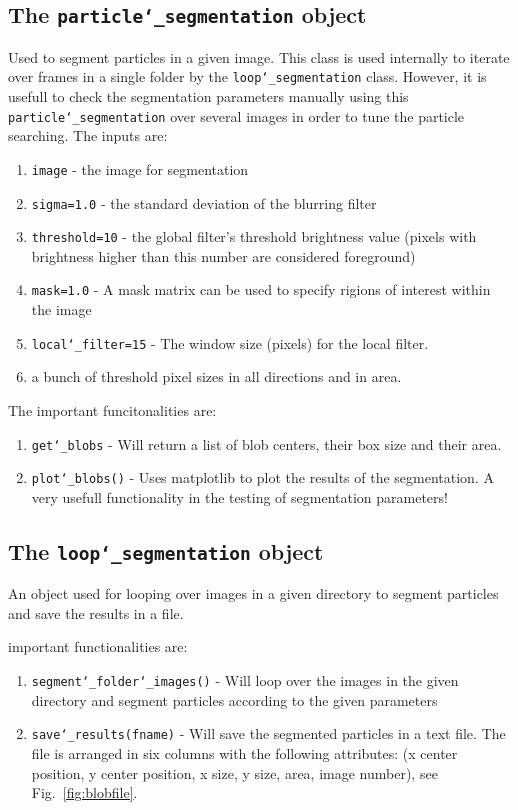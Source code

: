 \documentclass[10pt,a4paper]{article}
\begin{document}
\subsection{The \texttt{particle\char`_segmentation} object} 

Used to segment particles in a given image. This class is used internally to iterate over frames in a single folder by the \texttt{loop\char`_segmentation} class. However, it is usefull to check the segmentation parameters manually using this \texttt{particle\char`_segmentation} over several images in order to tune the particle searching. The inputs are:
%
\begin{enumerate}
	\item \texttt{image} - the image for segmentation
	\item \texttt{sigma=1.0} - the standard deviation of the blurring filter
	\item \texttt{threshold=10} - the global filter's threshold brightness value (pixels with brightness higher than this number are considered foreground) 
	\item \texttt{mask=1.0} - A mask matrix can be used to specify rigions of interest within the image
	\item \texttt{local\char`_filter=15} - The window size (pixels) for the local filter.
	\item a bunch of threshold pixel sizes in all directions and in area.
\end{enumerate}


The important funcitonalities are:
%
\begin{enumerate}
	\item \texttt{get\char`_blobs} - Will return a list of blob centers, their box size and their area.
	\item \texttt{plot\char`_blobs()} - Uses matplotlib to plot the results of the segmentation. A very usefull functionality in the testing of segmentation parameters!
\end{enumerate}






\subsection{The \texttt{loop\char`_segmentation} object} 


An object used for looping over images in a given directory to segment particles
and save the results in a file.


important functionalities are:
%
\begin{enumerate}
	\item \texttt{segment\char`_folder\char`_images()} - Will loop over the images in the given directory and segment particles according to the given parameters
	\item \texttt{save\char`_results(fname)} - Will save the segmented particles in a text file. The file is arranged in six columns with the following attributes: (x center position, y center position, x size, y size, area, image number), see Fig.~\ref{fig:blobfile}.
\end{enumerate}
\end{document}
